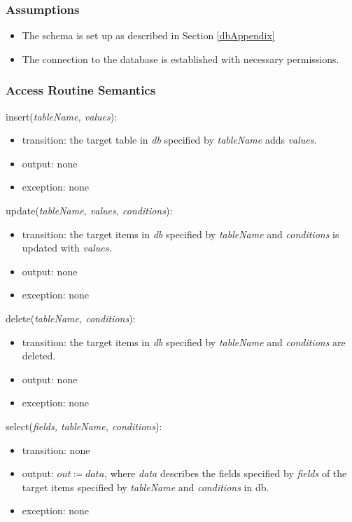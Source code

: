 \documentclass[12pt, titlepage]{article}
\begin{document}
\subsubsection{Assumptions}
\begin{itemize}
  \item The schema is set up as described in Section \ref{dbAppendix}\\
  \item The connection to the database is established with necessary permissions.
\end{itemize}

\subsubsection{Access Routine Semantics}

\noindent insert(\textit{tableName, values}):
\begin{itemize}
\item transition: the target table in \textit{db} specified by \textit{tableName} adds \textit{values}.
\item output: none
\item exception: none
\end{itemize}

\noindent update(\textit{tableName, values, conditions}):
\begin{itemize}
\item transition: the target items in \textit{db} specified by \textit{tableName} and \textit{conditions} is updated with \textit{values}.
\item output: none
\item exception: none
\end{itemize}

\noindent delete(\textit{tableName, conditions}):
\begin{itemize}
\item transition: the target items in \textit{db} specified by \textit{tableName} and \textit{conditions} are deleted.
\item output: none
\item exception: none
\end{itemize}

\noindent select(\textit{fields, tableName, conditions}):
\begin{itemize}
\item transition: none
\item output: $out \coloneqq data$, where \textit{data} describes the fields specified by \textit{fields} of the target items specified by \textit{tableName} and \textit{conditions} in db.
\item exception: none
\end{itemize}
\end{document}
